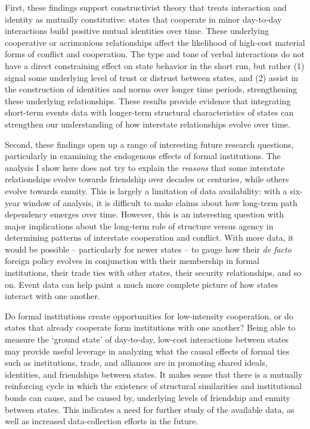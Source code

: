 \documentclass[10pt,]{article}
\begin{document}
First, these findings support constructivist theory that treats
interaction and identity as mutually constitutive: states that cooperate
in minor day-to-day interactions build positive mutual identities over
time. These underlying cooperative or acrimonious relationships affect
the likelihood of high-cost material forms of conflict and cooperation.
The type and tone of verbal interactions do not have a direct
constraining effect on state behavior in the short run, but rather (1)
signal some underlying level of trust or distrust between states, and
(2) assist in the construction of identities and norms over longer time
periods, strengthening these underlying relationships. These results
provide evidence that integrating short-term events data with
longer-term structural characteristics of states can strengthen our
understanding of how interstate relationships evolve over time.

Second, these findings open up a range of interesting future research
questions, particularly in examining the endogenous effects of formal
institutions. The analysis I show here does not try to explain the
\emph{reasons} that some interstate relationships evolve towards
friendship over decades or centuries, while others evolve towards
enmity. This is largely a limitation of data availability: with a
six-year window of analysis, it is difficult to make claims about how
long-term path dependency emerges over time. However, this is an
interesting question with major implications about the long-term role of
structure versus agency in determining patterns of interstate
cooperation and conflict. With more data, it would be possible --
particularly for newer states -- to gauge how their \emph{de facto}
foreign policy evolves in conjunction with their membership in formal
institutions, their trade ties with other states, their security
relationships, and so on. Event data can help paint a much more complete
picture of how states interact with one another.

Do formal institutions create opportunities for low-intensity
cooperation, or do states that already cooperate form institutions with
one another? Being able to measure the `ground state' of day-to-day,
low-cost interactions between states may provide useful leverage in
analyzing what the causal effects of formal ties such as institutions,
trade, and alliances are in promoting shared ideals, identities, and
friendships between states. It makes sense that there is a mutually
reinforcing cycle in which the existence of structural similarities and
institutional bonds can cause, and be caused by, underlying levels of
friendship and enmity between states. This indicates a need for further
study of the available data, as well as increased data-collection
efforts in the future.
\end{document}
